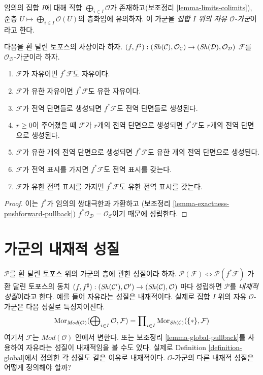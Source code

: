 \noindent
임의의 집합 $I$에 대해 직합 $\bigoplus_{i \in I} \mathcal{O}$가
존재하고(보조정리 \ref{lemma-limits-colimits}), 준층
$U \mapsto \bigoplus_{i \in I} \mathcal{O}(U)$의 층화임에 유의하자.
이 가군을 {\it 집합 $I$ 위의 자유 $\mathcal{O}$-가군}이라고 한다.

\begin{lemma}
\label{lemma-global-pullback}
다음을 환 달린 토포스의 사상이라 하자.
$(f, f^\sharp) :
(\mathop{\mathit{Sh}}\nolimits(\mathcal{C}), \mathcal{O}_\mathcal{C})
\to
(\mathop{\mathit{Sh}}\nolimits(\mathcal{D}), \mathcal{O}_\mathcal{D})$
$\mathcal{F}$를 $\mathcal{O}_\mathcal{D}$-가군이라 하자.
\begin{enumerate}
\item $\mathcal{F}$가 자유이면 $f^*\mathcal{F}$도 자유이다.
\item $\mathcal{F}$가 유한 자유이면 $f^*\mathcal{F}$도 유한 자유이다.
\item $\mathcal{F}$가 전역 단면들로 생성되면 $f^*\mathcal{F}$도 전역
단면들로 생성된다.
\item $r \geq 0$이 주어졌을 때 $\mathcal{F}$가 $r$개의 전역 단면으로
생성되면 $f^*\mathcal{F}$도 $r$개의 전역 단면으로 생성된다.
\item $\mathcal{F}$가 유한 개의 전역 단면으로 생성되면
$f^*\mathcal{F}$도 유한 개의 전역 단면으로 생성된다.
\item $\mathcal{F}$가 전역 표시를 가지면 $f^*\mathcal{F}$도 전역 표시를 갖는다.
\item $\mathcal{F}$가 유한 전역 표시를 가지면 $f^*\mathcal{F}$도 유한
전역 표시를 갖는다.
\end{enumerate}
\end{lemma}

\begin{proof}
이는 $f^*$가 임의의 쌍대극한과 가환하고
(보조정리 \ref{lemma-exactness-pushforward-pullback})
$f^*\mathcal{O}_\mathcal{D} = \mathcal{O}_\mathcal{C}$이기 때문에 성립한다.
\end{proof}






\section{가군의 내재적 성질}
\label{section-intrinsic}

\noindent
$\mathcal{P}$를 환 달린 토포스 위의 가군의 층에 관한 성질이라 하자.
$\mathcal{P}(\mathcal{F}) \Leftrightarrow \mathcal{P}(f^*\mathcal{F})$
가 환 달린 토포스의 동치
$(f, f^\sharp) :
(\mathop{\mathit{Sh}}\nolimits(\mathcal{C}'), \mathcal{O}')
\to
(\mathop{\mathit{Sh}}\nolimits(\mathcal{C}), \mathcal{O})$
마다 성립하면 $\mathcal{P}$를 {\it 내재적 성질}이라고 한다.
예를 들어 자유라는 성질은 내재적이다. 실제로 집합 $I$ 위의 자유
$\mathcal{O}$-가군은 다음 성질로 특징지어진다.
$$
\mathop{\mathrm{Mor}}\nolimits_{\textit{Mod}(\mathcal{O})}(
\bigoplus\nolimits_{i \in I} \mathcal{O},
\mathcal{F})
=
\prod\nolimits_{i \in I} \mathop{\mathrm{Mor}}\nolimits_{\mathop{\mathit{Sh}}\nolimits(\mathcal{C})}(\{*\},
\mathcal{F})
$$
여기서 $\mathcal{F}$는 $\textit{Mod}(\mathcal{O})$ 안에서 변한다.
또는 보조정리 \ref{lemma-global-pullback}를 사용하여 자유라는 성질이
내재적임을 볼 수도 있다. 실제로 Definition \ref{definition-global}에서
정의한 각 성질도 같은 이유로 내재적이다. $\mathcal{O}$-가군의 다른
내재적 성질은 어떻게 정의해야 할까?

